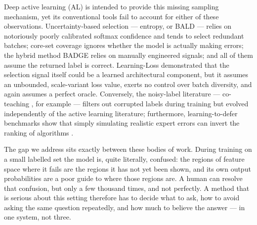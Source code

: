 \documentclass[a4paper,fleqn,longmktitle]{cas-sc}
\begin{document}
Deep active learning (AL) is intended to provide this missing sampling
mechanism, yet its conventional tools fail to account for either of
these observations. Uncertainty-based selection --- entropy, or BALD
\citep{gal2017} --- relies on notoriously poorly calibrated softmax
confidence and tends to select redundant batches; core-set coverage
\citep{sener2018} ignores whether the model is actually making errors;
the hybrid method BADGE \citep{ash2020} relies on manually engineered
signals; and all of them assume the returned label is correct.
Learning-Loss \citep{yoo2019} demonstrated that the selection signal
itself could be a learned architectural component, but it assumes an
unbounded, scale-variant loss value, exerts no control over batch
diversity, and again assumes a perfect oracle. Conversely, the
noisy-label literature --- co-teaching \citep{han2018}, for example ---
filters out corrupted labels during training but evolved independently
of the active learning literature; furthermore, learning-to-defer
benchmarks show that simply simulating realistic expert errors can
invert the ranking of algorithms \citep{alves2025,mozannar2020}.

The gap we address sits exactly between these bodies of work. During
training on a small labelled set the model is, quite literally,
confused: the regions of feature space where it fails are the regions
it has not yet been shown, and its own output probabilities are a poor
guide to where those regions are. A human can resolve that confusion,
but only a few thousand times, and not perfectly. A method that is
serious about this setting therefore has to decide what to ask, how to
avoid asking the same question repeatedly, and how much to believe the
answer --- in one system, not three.
\end{document}
